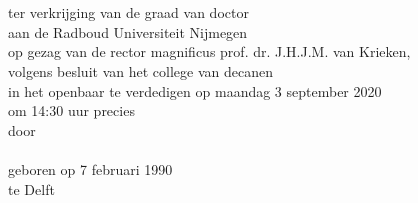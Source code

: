 \newpage

\thispagestyle{empty}
\vspace*{4em}
%
\begin{center}
\huge{}\\

\normalsize

{\Large\scshape{}}\\[2.5em]


ter verkrijging van de graad van doctor\\
aan de Radboud Universiteit Nijmegen\\
op gezag van de rector magnificus prof. dr. J.H.J.M. van Krieken,\\
volgens besluit van het college van decanen\\
in het openbaar te verdedigen op maandag 3 september 2020\\
om 14:30 uur precies\\[1.5em]

door\\[1.5em]

{\Large\scshape{}}\\[1.5em]

geboren op 7 februari 1990\\
te Delft
\end{center}
\newpage
\thispagestyle{empty}

\noindent

